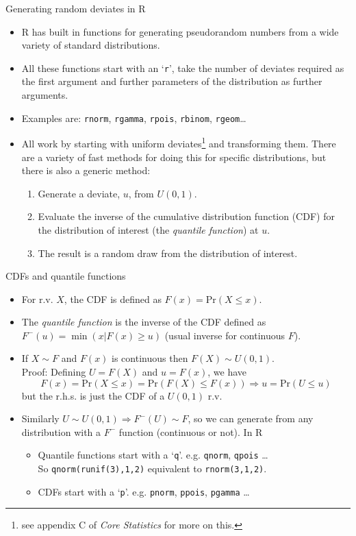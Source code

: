 \documentclass{beamer}
\begin{document}
\begin{frame}{Generating random deviates in R}
\begin{itemize}
\item R has built in functions for generating pseudorandom numbers from a wide variety of standard distributions. 
\item All these functions start with an `{\tt r}', take the number of deviates required as the first argument and further parameters of the distribution as further arguments. 
\item Examples are: {\tt rnorm}, {\tt rgamma}, {\tt rpois}, {\tt rbinom}, {\tt rgeom}\ldots
\item All work by starting with uniform deviates\footnote{see appendix C of {\em Core Statistics} for more on this.} and transforming them. There are a variety of fast methods for doing this for specific distributions, but there is also a generic method:
\begin{enumerate}
\item Generate a deviate, $u$, from $U(0,1)$.
\item Evaluate the inverse of the cumulative distribution function (CDF) for the distribution of interest (the {\em quantile function}) at $u$.
\item The result is a random draw from the distribution of interest.
\end{enumerate}
\end{itemize}
\end{frame}

\begin{frame}[fragile]{CDFs and quantile functions}
\begin{itemize}
\item For r.v. $X$, the CDF is defined as $F(x) = \text{Pr}(X \le x)$.
\item The {\em quantile function} is the inverse of the CDF defined as $F^-(u) = \min(x|F(x) \ge u)$ (usual inverse for continuous $F$).
\item If $X \sim F$ and $F(x)$ is continuous then $  F(X) \sim U(0,1)$. \\Proof: Defining $U = F(X) $ and $u = F(x)$, we have
$$ F(x) = \text{Pr}(X \le x) =  \text{Pr}(F(X) \le F(x)) \Rightarrow u = \text{Pr}(U \le u)$$
but the r.h.s. is just the CDF of a $U(0,1)$ r.v.
\item Similarly $U \sim U(0,1) \Rightarrow F^{-} (U) \sim F$, so we can generate from any distribution with a $F^-$ function (continuous or not). In R 
\begin{itemize}
\item Quantile functions start with a `{\tt q}'. e.g. {\tt qnorm}, {\tt qpois} \ldots\\
So \verb+qnorm(runif(3),1,2)+ equivalent to \verb+rnorm(3,1,2)+.
\item CDFs start with a `{\tt p}'. e.g. {\tt pnorm}, {\tt ppois}, {\tt pgamma} \ldots
\end{itemize}
\end{itemize}

\end{frame}
\end{document}
